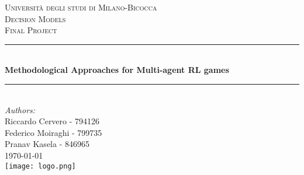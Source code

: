 \begin{titlepage}

\newcommand{\HRule}{\rule{\linewidth}{0.5mm}} %

\center %
 

\textsc{\LARGE Università degli studi di Milano-Bicocca}\\[1cm] %
\textsc{\Large Decision Models}\\[0.3cm] %
\textsc{\large Final Project}\\[0.1cm] %


\HRule \\[0.4cm]
{ \huge \bfseries Methodological Approaches for Multi-agent RL games}\\[0.4cm] %
\HRule \\[1.5cm]
 

\large
\emph{Authors:}\\
Riccardo Cervero - 794126\\   
Federico Moiraghi - 799735\\ 
Pranav Kasela - 846965\\[1cm] 

{\large \today}\\[2cm] 


\texttt{[image: logo.png]}\\[1cm] 

\vfill %

\end{titlepage}


